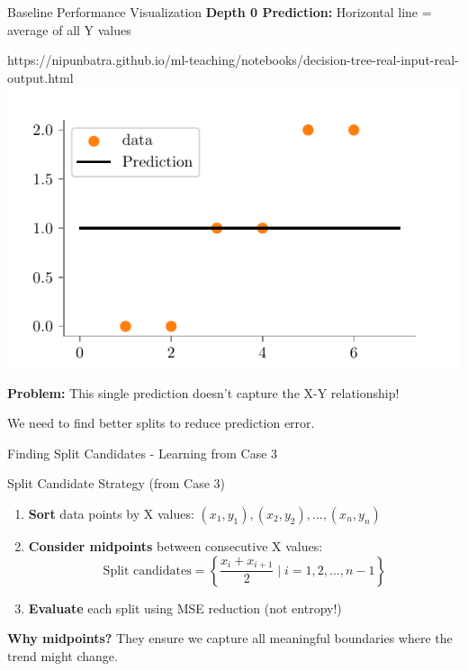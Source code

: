 \documentclass[usenames,dvipsnames]{beamer}
\begin{document}
    \begin{frame}{Baseline Performance Visualization}
    \textbf{Depth 0 Prediction:} Horizontal line = average of all Y values
    \begin{center}
    	\begin{notebookbox}{https://nipunbatra.github.io/ml-teaching/notebooks/decision-tree-real-input-real-output.html}
    		\includegraphics{../assets/decision-trees/figures/ri-ro-depth-0.pdf}	
    	  \end{notebookbox}
    \end{center}
    
    \textbf{Problem:} This single prediction doesn't capture the X-Y relationship!
    
    We need to find better splits to reduce prediction error.
    \end{frame}

\begin{frame}{Finding Split Candidates - Learning from Case 3}
\begin{definitionbox}{Split Candidate Strategy (from Case 3)}
\begin{enumerate}
\item \textbf{Sort} data points by X values: $(x_1, y_1), (x_2, y_2), \ldots, (x_n, y_n)$
\item \textbf{Consider midpoints} between consecutive X values:
   $$\text{Split candidates} = \left\{\frac{x_i + x_{i+1}}{2} \mid i = 1, 2, \ldots, n-1\right\}$$
\item \textbf{Evaluate} each split using MSE reduction (not entropy!)
\end{enumerate}
\end{definitionbox}

\textbf{Why midpoints?} They ensure we capture all meaningful boundaries where the trend might change.
\end{frame}
\end{document}
